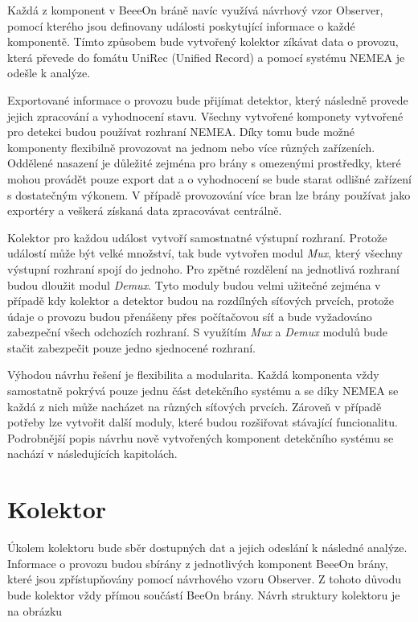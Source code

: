  Každá z komponent v BeeeOn bráně navíc využívá návrhový vzor Observer, pomocí kterého jsou
 definovany události poskytující informace o každé komponentě. 
 Tímto způsobem bude vytvořený kolektor zíkávat data o provozu, která
 převede do fomátu UniRec (Unified Record) a pomocí systému NEMEA je odešle k analýze.
 
 Exportované informace o provozu bude přijímat detektor, který následně provede jejich zpracování a 
 vyhodnocení stavu. Všechny vytvořené komponety vytvořené pro detekci budou používat rozhraní 
 NEMEA. Díky tomu bude možné komponenty flexibilně provozovat na jednom nebo více různých zařízeních.
 Oddělené nasazení je důležité zejména pro brány s omezenými prostředky, které mohou provádět 
 pouze export dat a o vyhodnocení se bude starat odlišné zařízení s dostatečným výkonem. V případě 
 provozování více bran lze brány používat jako exportéry a veškerá získaná data zpracovávat 
 centrálně. 
 
 Kolektor pro každou událost vytvoří samostnatné výstupní rozhraní. Protože událostí může být 
 velké množství, tak bude vytvořen modul \textit{Mux}, který všechny výstupní rozhraní spojí do jednoho. 
 Pro zpětné rozdělení na jednotlivá rozhraní budou dloužit modul \textit{Demux}. Tyto moduly budou velmi užitečné
 zejména v případě kdy kolektor a detektor budou na rozdílných síťových prvcích, protože údaje 
 o provozu budou přenášeny přes počítačovou síť a bude vyžadováno zabezpeční všech odchozích
 rozhraní. S využítím \textit{Mux} a \textit{Demux} modulů bude stačit zabezpečit pouze jedno sjednocené rozhraní. 
 
 Výhodou návrhu řešení je flexibilita a modularita. Každá komponenta vždy samostatně pokrývá pouze jednu
 část detekčního systému a se díky NEMEA se každá z nich může nacházet na různých síťových prvcích. Zároveň
 v případě potřeby lze vytvořit další moduly, které budou rozšiřovat stávající funcionalitu.
 Podrobnější popis návrhu nově vytvořených komponent detekčního systému se nachází v následujících kapitolách.
 
 \section{Kolektor}
 Úkolem kolektoru bude sběr dostupných dat a jejich odeslání k následné analýze. Informace o 
 provozu budou sbírány z jednotlivých komponent BeeeOn brány, které jsou zpřístupňovány pomocí 
 návrhového vzoru Observer. Z tohoto důvodu bude kolektor vždy přímou součástí BeeOn brány. 
 Návrh struktury kolektoru je na obrázku 
 

